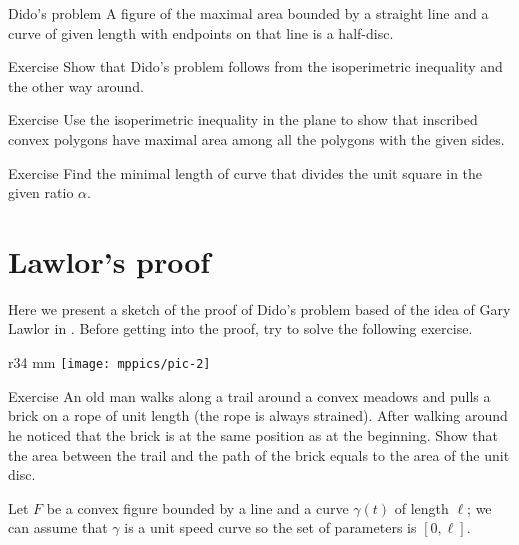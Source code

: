 \begin{thm}{Dido's problem}
A figure of the maximal area bounded by a straight line and a curve of given length with endpoints on that line is a half-disc.
\end{thm}

\begin{thm}{Exercise}\label{ex:dido-isop}
Show that Dido's problem follows from the isoperimetric inequality and the other way around.
\end{thm}


\begin{thm}{Exercise}
Use the isoperimetric inequality in the plane to show that 
inscribed convex polygons have maximal area among all the polygons with the given sides.
\end{thm}

\begin{thm}{Exercise}
Find the minimal length of curve that divides the unit square in the given ratio $\alpha$.  
\end{thm}

\section{Lawlor's proof}

Here we present a sketch of the proof of Dido's problem based of the idea of Gary Lawlor in \cite{lawlor}.
Before getting into the proof, try to solve the following exercise.

{

\begin{wrapfigure}{r}{34 mm}
\vskip-4mm
\centering
\texttt{[image: mppics/pic-2]}
\end{wrapfigure}

\begin{thm}{Exercise}
An old man walks along a trail around a convex meadows and pulls a brick on a rope of unit length (the rope is always strained).
After walking around he noticed that the brick is at the same position as at the beginning.
Show that the area between the trail and the path of the brick equals to the area of the unit disc. 

\end{thm}

}

Let $F$ be a convex figure bounded by a line and a curve $\gamma(t)$ of length $\ell$;
we can assume that $\gamma$ is a unit speed curve so the set of parameters is $[0,\ell]$.

